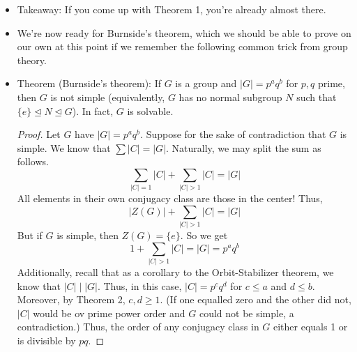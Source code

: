 \documentclass[../notes.tex]{subfiles}
\begin{document}
\begin{itemize}
\begin{proof}
        Let's now use this $V$ such that $p\nmid\dim V$ and $\chi_V(g)\neq 0$. Since $p\nmid\dim V$, $|C|=p^k\nmid\dim V$. Thus, $(|C|,\dim V)=1$. Having proven this fact and $\chi_V(g)\neq 0$ for an \emph{arbitrary} $g\in C$, it follows by Theorem 1 that for all $a\in C$, $\rho_V(a)=\varepsilon\diag(1,\dots,1)=\varepsilon I$\footnote{How do we know it's true for all $a\in G$; couldn't they have different $\varepsilon$ or couldn't we get different $V$'s??}. Thus, if $a_1\neq a_2\in C$, $\rho_V(a_1a_2^{-1})=I$, so $a_1a_2^{-1}\in\ker(\rho_V)$, so the kernel is a normal nontrivial subgroup. The kernel is also not equal to $G$ because elements of it act trivially on $V$, a nontrivial representation, implying the existence of additional $\rho(g)$'s that act nontrivially.
    \end{proof}
    \item Takeaway: If you come up with Theorem 1, you're already almost there.
    \item We're now ready for Burnside's theorem, which we should be able to prove on our own at this point if we remember the following common trick from group theory.
    \item Theorem (Burnside's theorem): If $G$ is a group and $|G|=p^aq^b$ for $p,q$ prime, then $G$ is not simple (equivalently, $G$ has no normal subgroup $N$ such that $\{e\}\trianglelefteq N\trianglelefteq G$). In fact, $G$ is solvable.
    \begin{proof}
        Let $G$ have $|G|=p^aq^b$. Suppose for the sake of contradiction that $G$ is simple. We know that $\sum|C|=|G|$. Naturally, we may split the sum as follows.
        \begin{equation*}
            \sum_{|C|=1}|C|+\sum_{|C|>1}|C| = |G|
        \end{equation*}
        All elements in their own conjugacy class are those in the center! Thus,
        \begin{equation*}
            |Z(G)|+\sum_{|C|>1}|C| = |G|
        \end{equation*}
        But if $G$ is simple, then $Z(G)=\{e\}$. So we get
        \begin{equation*}
            1+\sum_{|C|>1}|C| = |G| = p^aq^b
        \end{equation*}
        Additionally, recall that as a corollary to the Orbit-Stabilizer theorem, we know that $|C|\mid|G|$. Thus, in this case, $|C|=p^cq^d$ for $c\leq a$ and $d\leq b$. Moreover, by Theorem 2, $c,d\geq 1$. (If one equalled zero and the other did not, $|C|$ would be ov prime power order and $G$ could not be simple, a contradiction.) Thus, the order of any conjugacy class in $G$ either equals 1 or is divisible by $pq$.\par

\end{proof}
\end{itemize}
\end{document}
